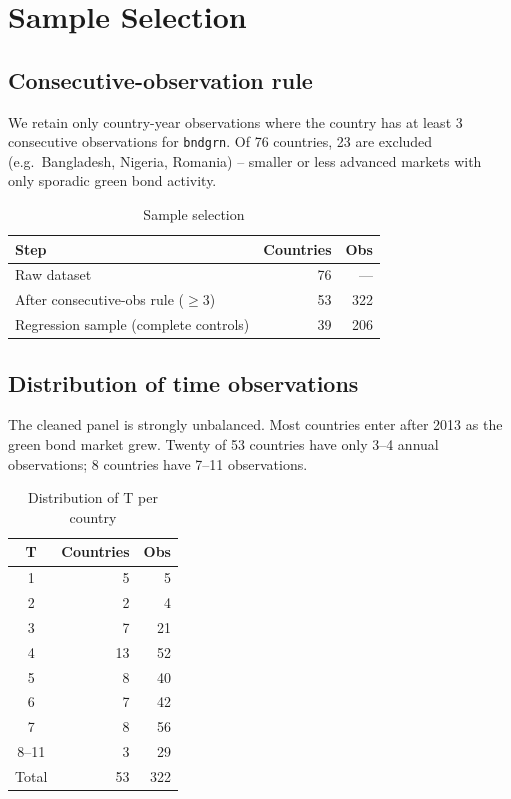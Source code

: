 \documentclass[12pt,a4paper]{article}
\begin{document}
\section{Sample Selection}

\subsection{Consecutive-observation rule}

We retain only country-year observations where the country has at least
3 consecutive observations for \texttt{bndgrn}. Of 76 countries, 23 are
excluded (e.g.\ Bangladesh, Nigeria, Romania) -- smaller or less advanced
markets with only sporadic green bond activity.

\begin{table}[H]
\centering
\caption{Sample selection}
\label{tab:sample}
\begin{tabular}{lrr}
\toprule
Step & Countries & Obs \\
\midrule
Raw dataset                            & 76 & --- \\
After consecutive-obs rule ($\geq 3$)  & 53 & 322 \\
Regression sample (complete controls)  & 39 & 206 \\
\bottomrule
\end{tabular}
\end{table}

\subsection{Distribution of time observations}

The cleaned panel is strongly unbalanced. Most countries enter after 2013
as the green bond market grew. Twenty of 53 countries have only 3--4 annual
observations; 8 countries have 7--11 observations.

\begin{table}[H]
\centering
\caption{Distribution of T per country}
\label{tab:tdist}
\begin{tabular}{crr}
\toprule
T & Countries & Obs \\
\midrule
1  & 5  &   5 \\
2  & 2  &   4 \\
3  & 7  &  21 \\
4  & 13 &  52 \\
5  & 8  &  40 \\
6  & 7  &  42 \\
7  & 8  &  56 \\
8--11 & 3 & 29 \\
\midrule
Total & 53 & 322 \\
\bottomrule
\end{tabular}
\end{table}
\end{document}
